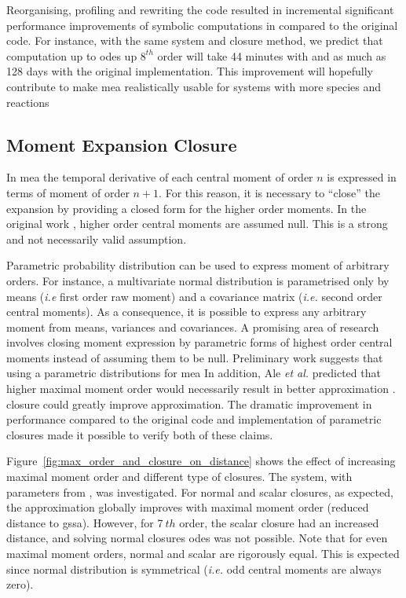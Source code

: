 Reorganising, profiling and rewriting the code resulted in incremental significant performance improvements of symbolic computations in \means{} compared to the original \mat{} code.
For instance, with the same \pft{} system and closure method, 
we predict that computation up to \gls{ode}s up $8^{th}$ order will take 44 minutes with \means{} and as much as 128 days with the original implementation.
This improvement will hopefully contribute to make \gls{mea} realistically usable for systems with more species and reactions


\subsection{Moment Expansion Closure}

In \gls{mea} the temporal derivative of each central moment of order $n$ is expressed in terms of moment of order $n+1$.
For this reason, it is necessary to ``close'' the expansion by providing a closed form for the higher order moments.
In the original work \cite{ale_general_2013}, higher order central moments are assumed null. 
This is a strong and not necessarily valid assumption. 

Parametric probability distribution can be used to express moment of arbitrary orders. 
For instance, a multivariate normal distribution is parametrised only by means (\emph{i.e } first order raw moment)
and a covariance matrix (\emph{i.e.} second order central moments). 
As a consequence, it is possible to express any arbitrary moment from means, variances and covariances. 
A promising area of research involves closing moment expression by parametric forms of highest order central moments instead
of assuming them to be null.
Preliminary work  suggests that using a parametric distributions for \gls{mea}
In addition, Ale \emph{et al.} predicted that higher maximal moment order would necessarily result in better approximation \cite{ale_general_2013}.
closure could greatly improve approximation.
The dramatic improvement in performance compared to the original code and implementation of parametric closures made it possible to verify both of these claims.

Figure~\ref{fig:max_order_and_closure_on_distance} shows the effect of increasing maximal moment order and different type of closures.
The \pft system, with parameters from \cite{ale_general_2013}, was investigated.
For normal and scalar closures, as expected, the approximation globally improves with maximal moment order (reduced distance to \gls{gssa}).
However, for 7$~{th}$ order, the scalar closure had an increased distance, and solving normal closures \gls{ode}s was not possible.
Note that for even maximal moment orders, normal and scalar are rigorously equal.
This is expected since normal distribution is symmetrical (\emph{i.e.} odd central moments are always zero).

